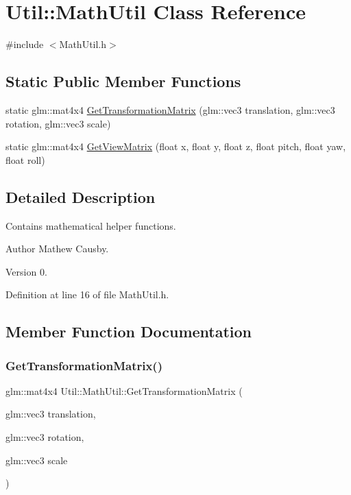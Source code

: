 \hypertarget{class_util_1_1_math_util}{}\section{Util\+:\+:Math\+Util Class Reference}
\label{class_util_1_1_math_util}


{\ttfamily \#include $<$Math\+Util.\+h$>$}

\subsection*{Static Public Member Functions}
\begin{DoxyCompactItemize}
\item 
static glm\+::mat4x4 \hyperlink{class_util_1_1_math_util_aecfa1962d61e7f63d30bee7dbeb0cd9f}{Get\+Transformation\+Matrix} (glm\+::vec3 translation, glm\+::vec3 rotation, glm\+::vec3 scale)
\item 
static glm\+::mat4x4 \hyperlink{class_util_1_1_math_util_abbc94837eaa9a0e2bb4c772a61b36ce7}{Get\+View\+Matrix} (float x, float y, float z, float pitch, float yaw, float roll)
\end{DoxyCompactItemize}


\subsection{Detailed Description}
Contains mathematical helper functions. \begin{DoxyAuthor}{Author}
Mathew Causby. 
\end{DoxyAuthor}
\begin{DoxyVersion}{Version}
0. 
\end{DoxyVersion}


Definition at line 16 of file Math\+Util.\+h.



\subsection{Member Function Documentation}
\mbox{\label{class_util_1_1_math_util_aecfa1962d61e7f63d30bee7dbeb0cd9f}} 
\subsubsection{\texorpdfstring{Get\+Transformation\+Matrix()}{GetTransformationMatrix()}}
{\footnotesize\ttfamily glm\+::mat4x4 Util\+::\+Math\+Util\+::\+Get\+Transformation\+Matrix (\begin{DoxyParamCaption}\item[{glm\+::vec3}]{translation,  }\item[{glm\+::vec3}]{rotation,  }\item[{glm\+::vec3}]{scale }\end{DoxyParamCaption})\hspace{0.3cm}{\ttfamily [static]}}

